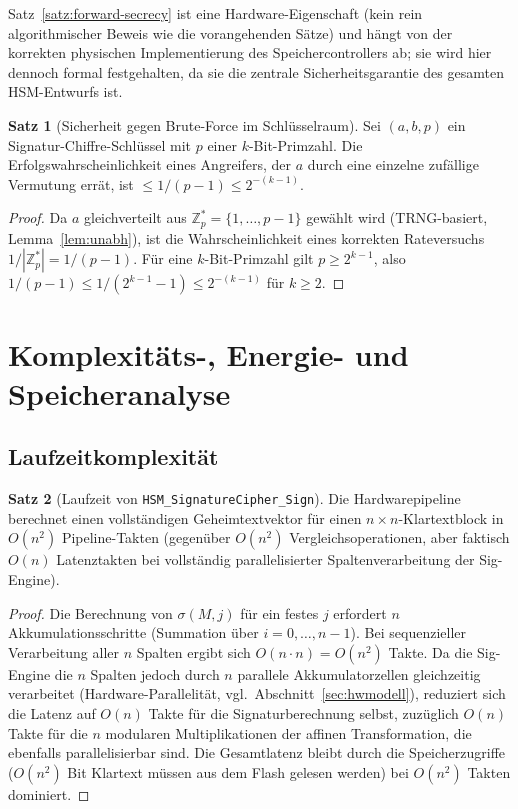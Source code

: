 ﻿\documentclass[a4paper,12pt]{article}
\theoremstyle{definition}
\newtheorem{satz}{Satz}
\begin{document}
Satz~\ref{satz:forward-secrecy} ist eine Hardware-Eigenschaft (kein rein algorithmischer Beweis wie die vorangehenden Sätze) und hängt von der korrekten physischen Implementierung des Speichercontrollers ab; sie wird hier dennoch formal festgehalten, da sie die zentrale Sicherheitsgarantie des gesamten HSM-Entwurfs ist.

\begin{satz}[Sicherheit gegen Brute-Force im Schlüsselraum]
	Sei $(a,b,p)$ ein Signatur-Chiffre-Schlüssel mit $p$ einer $k$-Bit-Primzahl. Die Erfolgswahrscheinlichkeit eines Angreifers, der $a$ durch eine einzelne zufällige Vermutung errät, ist $\le 1/(p-1) \le 2^{-(k-1)}$.
\end{satz}

\begin{proof}
	Da $a$ gleichverteilt aus $\mathbb{Z}_p^* = \{1,\ldots,p-1\}$ gewählt wird (TRNG-basiert, Lemma~\ref{lem:unabh}), ist die Wahrscheinlichkeit eines korrekten Rateversuchs $1/|\mathbb{Z}_p^*| = 1/(p-1)$. Für eine $k$-Bit-Primzahl gilt $p \ge 2^{k-1}$, also $1/(p-1) \le 1/(2^{k-1}-1) \le 2^{-(k-1)}$ für $k \ge 2$. \qedhere
\end{proof}

\section{Komplexitäts-, Energie- und Speicheranalyse}
\label{sec:analyse}

\subsection{Laufzeitkomplexität}

\begin{satz}[Laufzeit von \texttt{HSM\_SignatureCipher\_Sign}]
	Die Hardwarepipeline berechnet einen vollständigen Geheimtextvektor für einen $n \times n$-Klartextblock in $O(n^2)$ Pipeline-Takten (gegenüber $O(n^2)$ Vergleichsoperationen, aber faktisch $O(n)$ Latenztakten bei vollständig parallelisierter Spaltenverarbeitung der Sig-Engine).
\end{satz}

\begin{proof}
	Die Berechnung von $\sigma(M,j)$ für ein festes $j$ erfordert $n$ Akkumulationsschritte (Summation über $i=0,\ldots,n-1$). Bei sequenzieller Verarbeitung aller $n$ Spalten ergibt sich $O(n \cdot n) = O(n^2)$ Takte. Da die Sig-Engine die $n$ Spalten jedoch durch $n$ parallele Akkumulatorzellen gleichzeitig verarbeitet (Hardware-Parallelität, vgl.\ Abschnitt~\ref{sec:hwmodell}), reduziert sich die Latenz auf $O(n)$ Takte für die Signaturberechnung selbst, zuzüglich $O(n)$ Takte für die $n$ modularen Multiplikationen der affinen Transformation, die ebenfalls parallelisierbar sind. Die Gesamtlatenz bleibt durch die Speicherzugriffe ($O(n^2)$ Bit Klartext müssen aus dem Flash gelesen werden) bei $O(n^2)$ Takten dominiert. \qedhere
\end{proof}
\end{document}
